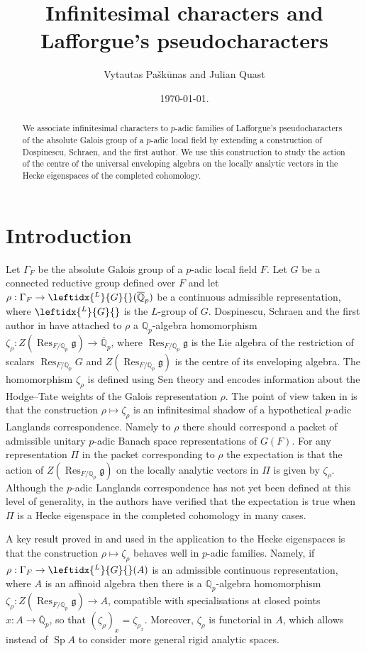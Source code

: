 \documentclass{amsart}
\title{Infinitesimal characters and Lafforgue's pseudocharacters}
\author{Vytautas Pa\v{s}k\={u}nas and  Julian Quast }
\date{\today.}
\theoremstyle{definition}
\theoremstyle{remark}
\DeclareMathOperator{\Res}{Res}
\DeclareMathOperator{\Sp}{Sp}
\newcommand{\Qp}{\mathbb {Q}_p}
\newcommand{\Qpbar}{\overline{\mathbb{Q}}_p}
\newcommand{\LG}{\leftidx{^L}{G}{}}
\begin{document}
 


\begin{abstract} 
We associate infinitesimal characters to $p$-adic families of Lafforgue's pseudocharacters of the absolute Galois group of a $p$-adic local field by extending a construction of Dospinescu, Schraen, and the first author. We use this construction to study the action of the centre of the universal enveloping algebra on the locally analytic vectors in the Hecke eigenspaces of the completed cohomology.
\end{abstract}
\maketitle

\tableofcontents


\section{Introduction}
Let $\Gamma_F$ be the absolute Galois group of a $p$-adic local field 
$F$. Let $G$ be a connected reductive group defined over $F$ and
let $\rho: \Gamma_F\rightarrow \LG(\Qpbar)$ be a continuous admissible
representation, where $\LG$ is the $L$-group of $G$. Dospinescu, Schraen and the first 
author in \cite{DPS} have attached to $\rho$ a $\Qp$-algebra homomorphism  $\zeta_{\rho}: Z(\Res_{F/\Qp} \mathfrak g)\rightarrow \Qpbar$, 
where $\Res_{F/\Qp} \mathfrak g$ is the Lie algebra of the restriction of scalars $\Res_{F/\Qp}G$ and 
$Z(\Res_{F/\Qp} \mathfrak g)$ is the centre of
its enveloping algebra. The homomorphism $\zeta_{\rho}$ is defined using Sen theory and encodes  information about the Hodge--Tate weights of the Galois representation $\rho$. The point of view taken in \cite{DPS} is 
that the construction $\rho \mapsto \zeta_{\rho}$ 
is an infinitesimal shadow of a hypothetical $p$-adic 
Langlands correspondence. Namely to $\rho$ there should
correspond a packet of admissible unitary $p$-adic Banach space 
representations of $G(F)$. For any representation $\Pi$ in the 
packet corresponding to $\rho$ the expectation is that the 
action of $Z(\Res_{F/\Qp} \mathfrak g)$ on the locally analytic vectors in $\Pi$ is given by $\zeta_{\rho}$. Although the
$p$-adic Langlands correspondence has not yet been defined at this level of generality, in \cite{DPS}  the authors have verified that the expectation is true when $\Pi$ 
is a Hecke eigenspace in the completed cohomology in many cases. 

A key result proved in \cite{DPS} and used in the application to the Hecke eigenspaces is that the construction $\rho\mapsto \zeta_{\rho}$ behaves well in $p$-adic families. 
Namely, if $\rho: \Gamma_F\rightarrow \LG(A)$
is an admissible continuous representation, where  $A$ is an affinoid algebra
then there is a $\Qp$-algebra homomorphism 
$\zeta_{\rho}: Z(\Res_{F/\Qp} \mathfrak g)\rightarrow A$, compatible with specialisations at closed points $x:A \rightarrow \Qpbar$, so that 
$ (\zeta_{\rho})_x = \zeta_{\rho_x}$. Moreover, $\zeta_{\rho}$ is functorial in $A$, which allows instead of $\Sp A$ to consider more general rigid analytic spaces. 
\end{document}
